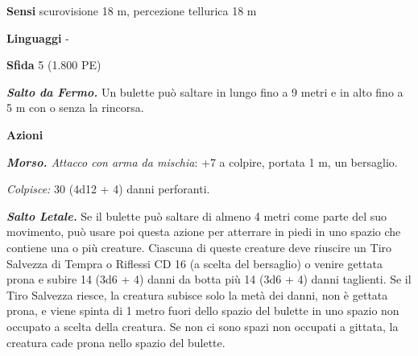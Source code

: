 \begin{multicols}{2}
\textbf{Sensi} scurovisione 18 m, percezione tellurica 18 m

\textbf{Linguaggi} -

\textbf{Sfida} 5 (1.800 PE)

\emph{\textbf{Salto da Fermo.}} Un bulette può saltare in lungo fino a 9  metri e in alto fino a 5 m con o senza la rincorsa.

\textbf{Azioni}

\emph{\textbf{Morso.} Attacco con arma da mischia}: +7 a colpire, portata 1 m, un bersaglio.

\emph{Colpisce:} 30 (4d12 + 4) danni perforanti.

\emph{\textbf{Salto Letale.}} Se il bulette può saltare di almeno 4  metri come parte del suo movimento, può usare poi questa azione per  atterrare in piedi in uno spazio che contiene una o più creature.  Ciascuna di queste creature deve riuscire un Tiro Salvezza di Tempra o Riflessi CD 16 (a scelta del bersaglio) o venire gettata prona e subire  14 (3d6 + 4) danni da botta più 14 (3d6 + 4) danni taglienti. Se il  Tiro Salvezza riesce, la creatura subisce solo la metà dei danni, non è  gettata prona, e viene spinta di 1 metro fuori dello spazio del  bulette in uno spazio non occupato a scelta della creatura. Se non ci  sono spazi non occupati a gittata, la creatura cade prona nello spazio  del bulette.


\end{multicols}
